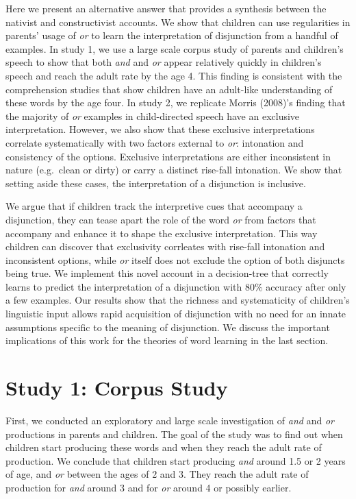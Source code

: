 \documentclass[10pt, letterpaper]{article}
\begin{document}
Here we present an alternative answer that provides a synthesis between
the nativist and constructivist accounts. We show that children can use
regularities in parents' usage of \emph{or} to learn the interpretation
of disjunction from a handful of examples. In study 1, we use a large
scale corpus study of parents and children's speech to show that both
\emph{and} and \emph{or} appear relatively quickly in children's speech
and reach the adult rate by the age 4. This finding is consistent with
the comprehension studies that show children have an adult-like
understanding of these words by the age four. In study 2, we replicate
Morris (2008)'s finding that the majority of \emph{or} examples in
child-directed speech have an exclusive interpretation. However, we also
show that these exclusive interpretations correlate systematically with
two factors external to \emph{or}: intonation and consistency of the
options. Exclusive interpretations are either inconsistent in nature
(e.g.~clean or dirty) or carry a distinct rise-fall intonation. We show
that setting aside these cases, the interpretation of a disjunction is
inclusive.

We argue that if children track the interpretive cues that accompany a
disjunction, they can tease apart the role of the word \emph{or} from
factors that accompany and enhance it to shape the exclusive
interpretation. This way children can discover that exclusivity
corrleates with rise-fall intonation and inconsistent options, while
\emph{or} itself does not exclude the option of both disjuncts being
true. We implement this novel account in a decision-tree that correctly
learns to predict the interpretation of a disjunction with 80\% accuracy
after only a few examples. Our results show that the richness and
systematicity of children's linguistic input allows rapid acquisition of
disjunction with no need for an innate assumptions specific to the
meaning of disjunction. We discuss the important implications of this
work for the theories of word learning in the last section.

\section{Study 1: Corpus Study}\label{study-1-corpus-study}

First, we conducted an exploratory and large scale investigation of
\emph{and} and \emph{or} productions in parents and children. The goal
of the study was to find out when children start producing these words
and when they reach the adult rate of production. We conclude that
children start producing \emph{and} around 1.5 or 2 years of age, and
\emph{or} between the ages of 2 and 3. They reach the adult rate of
production for \emph{and} around 3 and for \emph{or} around 4 or
possibly earlier.
\end{document}
